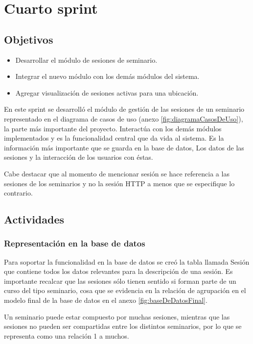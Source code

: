 ﻿\section{Cuarto sprint} %
\label{sec:cuarto_sprint}

\subsection{Objetivos}

\begin{itemize}
	\item Desarrollar el módulo de sesiones de seminario.
	\item Integrar el nuevo módulo con los demás módulos del sistema.
	\item Agregar visualización de sesiones activas para una ubicación.
\end{itemize}

En este sprint se desarrolló el módulo de gestión de las sesiones de un seminario representado en el diagrama de casos de uso (anexo \ref{fig:diagramaCasosDeUso}), la parte más importante del proyecto. Interactúa con los demás módulos implementados y es la funcionalidad central que da vida al sistema. Es la información más importante que se guarda en la base de datos, Los datos de las sesiones y la interacción de los usuarios con éstas.

Cabe destacar que al momento de mencionar sesión se hace referencia a las sesiones de los seminarios y no la sesión HTTP a menos que se especifique lo contrario.

\subsection{Actividades} %
\label{sub:actividades4}

\subsubsection{Representación en la base de datos}

Para soportar la funcionalidad en la base de datos se creó la tabla llamada Sesión que contiene todos los datos relevantes para la descripción de una sesión. Es importante recalcar que las sesiones sólo tienen sentido si forman parte de un curso del tipo seminario, cosa que se evidencia en la relación de agrupación en el modelo final de la base de datos en el anexo \ref{fig:baseDeDatosFinal}. 

Un seminario puede estar compuesto por muchas sesiones, mientras que las sesiones no pueden ser compartidas entre los distintos seminarios, por lo que se representa como una relación 1 a muchos. 

